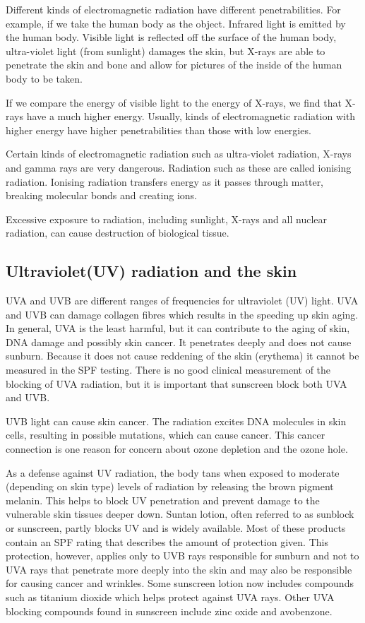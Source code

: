 Different kinds of electromagnetic radiation have different penetrabilities. For example, if we take the human body as the object. Infrared light is emitted by the human body. Visible light is reflected off the surface of the human body, ultra-violet light (from sunlight) damages the skin, but X-rays are able to penetrate the skin and bone and allow for pictures of the inside of the human body to be taken.

If we compare the energy of visible light to the energy of X-rays, we find that X-rays have a much higher energy. Usually, kinds of electromagnetic radiation with higher energy have higher penetrabilities than those with low energies.

Certain kinds of electromagnetic radiation such as ultra-violet radiation, X-rays and gamma rays are very dangerous. Radiation such as these are called ionising radiation. Ionising radiation transfers energy as it passes through matter, breaking molecular bonds and creating ions.
 
Excessive exposure to radiation, including sunlight, X-rays and all nuclear radiation, can cause destruction of biological tissue. 

\subsection{Ultraviolet(UV) radiation and the skin}
UVA and UVB are different ranges of frequencies for ultraviolet (UV) light. UVA and UVB can damage collagen fibres which results in the speeding up skin aging. In general, UVA is the least harmful, but it  can contribute to the aging of skin, DNA damage and possibly skin cancer. It penetrates deeply and does not cause sunburn. Because it does not cause reddening of the skin (erythema) it cannot be measured in the SPF testing. There is no good clinical measurement of the blocking of UVA radiation, but it is important that sunscreen block both UVA and UVB.

UVB light can cause skin cancer. The radiation excites DNA molecules in skin cells, resulting in possible mutations, which can cause cancer. This cancer connection is one reason for concern about ozone depletion and the ozone hole.

As a defense against UV radiation, the body tans when exposed to moderate (depending on skin type) levels of radiation by releasing the brown pigment melanin. This helps to block UV penetration and prevent damage to the vulnerable skin tissues deeper down. Suntan lotion, often referred to as sunblock or sunscreen, partly blocks UV and is widely available. Most of these products contain an SPF rating that describes the amount of protection given. This protection, however, applies only to UVB rays responsible for sunburn and not to UVA rays that penetrate more deeply into the skin and may also be responsible for causing cancer and wrinkles. Some sunscreen lotion now includes compounds such as titanium dioxide which helps protect against UVA rays. Other UVA blocking compounds found in sunscreen include zinc oxide and avobenzone.

